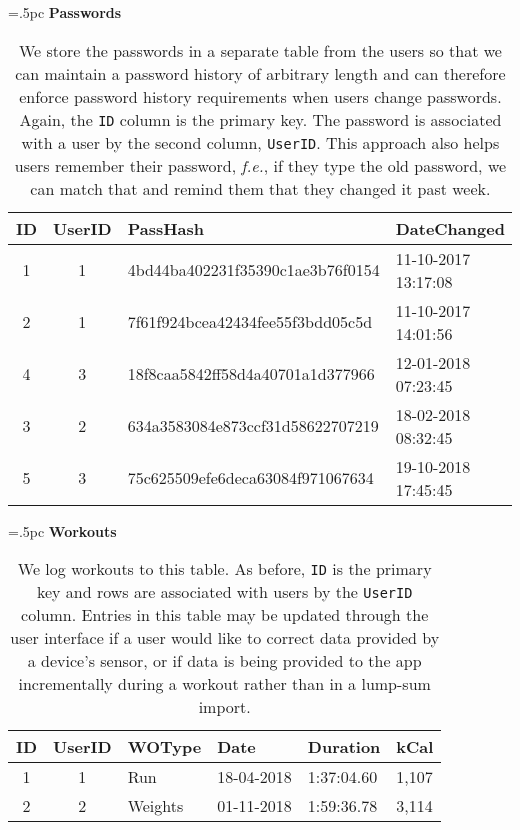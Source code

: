 \documentclass{article}
\theoremstyle{definition}
\begin{document}
\begin{table}[H]
	\centering
	\tabcolsep=.5pc
	{\bf Passwords}
	
	\begin{tabular}{ccll} \hline 
		ID & UserID & PassHash & DateChanged \\ \hline  
		1 & 1 & 4bd44ba402231f35390c1ae3b76f0154 & 11-10-2017 13:17:08 \\
		2 & 1 & 7f61f924bcea42434fee55f3bdd05c5d & 11-10-2017 14:01:56 \\
		4 & 3 & 18f8caa5842ff58d4a40701a1d377966 & 12-01-2018 07:23:45 \\
		3 & 2 & 634a3583084e873ccf31d58622707219 & 18-02-2018 08:32:45 \\
		5 & 3 & 75c625509efe6deca63084f971067634 & 19-10-2018 17:45:45 \\
		\hline 
	\end{tabular}
	\caption{\label{tab:passwd}
		We store the passwords in a separate table from the users so that we can maintain a password history of arbitrary length and can therefore enforce password history requirements when users change passwords. Again, the {\tt ID} column is the primary key. The password is associated with a user by the second column, {\tt UserID}. This approach also helps users remember their password, {\it f.e.}, if they type the old password, we can match that and remind them that they changed it past week.
	}
\end{table}


\begin{table}[H]
	\centering
	\tabcolsep=.5pc
	{\bf Workouts}
	
	\begin{tabular}{ccllll} \hline 
		ID & UserID & WOType & Date & Duration & kCal \\ \hline 
		1 & 1 & Run & 18-04-2018 & 1:37:04.60 & 1,107 \\  
		2 & 2 & Weights & 01-11-2018 & 1:59:36.78 & 3,114 \\ \hline 
		\hline 
	\end{tabular}
	\caption{\label{tab:workout}
		We log workouts to this table. As before, {\tt ID} is the primary key and rows are associated with users by the {\tt UserID} column. Entries in this table may be updated through the user interface if a user would like to correct data provided by a device's sensor, or if data is being provided to the app incrementally during a workout rather than in a lump-sum import.
	}
\end{table}
\end{document}
